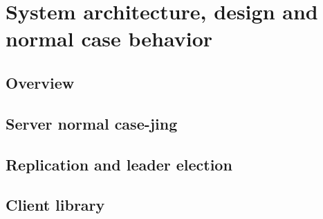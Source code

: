 \section{System architecture, design and normal case behavior}
\label{section:normal}

\subsection{Overview}


\subsection{Server normal case-jing}


\subsection{Replication and leader election}


\subsection{Client library}


